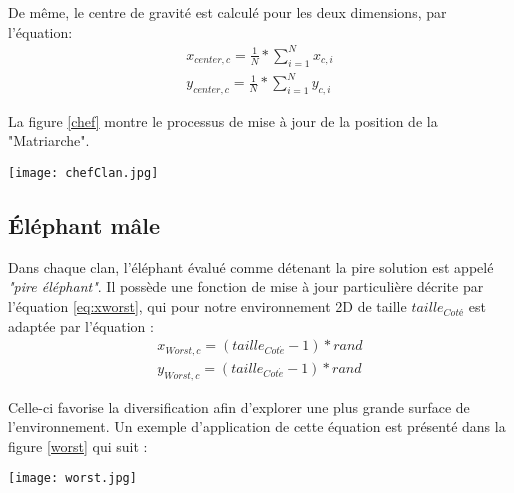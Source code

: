 De même, le centre de gravité est calculé pour les deux dimensions, par l'équation:
\begin{equation}
	\begin{split}
	{x}_{center,c}  = \frac{1}{N} * \sum_{i=1}^{N} {x}_{c,i}\\
	{y}_{center,c}  = \frac{1}{N} * \sum_{i=1}^{N} {y}_{c,i}
	\end{split}
\end{equation}

La figure \ref{chef} montre le processus de mise à jour de la position de la "Matriarche".

\begin{center}	  
	\texttt{[image: chefClan.jpg]}%
	\vspace{-0.1 cm}
	\label{chef}%
\end{center}

\subsection{Éléphant mâle}
Dans chaque clan, l'éléphant évalué comme détenant la pire solution est appelé \textit{"pire éléphant"}. Il possède une fonction de mise à jour particulière décrite par l'équation \ref{eq:xworst}, qui pour notre environnement 2D de taille $taille_{Coté}$ est adaptée par l'équation :
\begin{equation}
\begin{split}
{x}_{Worst,c}  =  (taille_{Cot\acute{e}} - 1) * rand \\
{y}_{Worst,c}  =  (taille_{Cot\acute{e}} - 1) * rand 
\end{split}
\end{equation}

Celle-ci favorise la diversification afin d'explorer une plus grande surface de l'environnement.
Un exemple d'application de cette équation est présenté dans la figure \ref{worst} qui suit :

\begin{center}	  
	\texttt{[image: worst.jpg]}%
	\vspace{-0.1 cm}
	\label{worst}%
\end{center}




